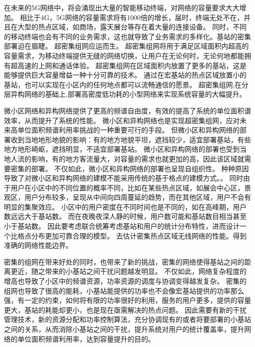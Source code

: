 

在未来的5G网络中，将会涌现出大量的智能移动终端，对网络的容量要求大大增加。
相比于4G，5G网络的容量需求将有1000倍的增长，届时，终端无处不在，并且在大型的热点区域，如商场，露天展台等存在着大量的连接设备。
同时，不同的移动终端也会有不同的业务需求，这也就导致了业务需求的多样化。基站的密集部署迫在眉睫。
超密集组网应运而生。
超密集组网将用于满足区域面积内超高的容量需求，为移动终端提供无缝的网络切换，让用户在无论何时，无论何地都能拥有超高速的上网和通话体验。
超密集组网在区域面积内放置了更多的基站，这是能够提供巨大容量增益一种十分可靠的技术。
通过在宏基站的热点区域放置小的基站，也可以实现在小区内的任何地点都可以流畅通信的愿景。
超密集组网,在分层异构网络的基础上,部署高密度低功耗的小型网络来实现系统容量的大幅提升。

微小区网络和异构网络提供了更高的频谱自由度，有效的提高了系统的单位面积谱效率，从而提升了系统的性能。
微小区和异构网络也是实现超密集组网，应对未来高单位面积频谱利用率挑战的一种重要可行的手段。
但微小区和异构网络的部署收到当地地形地貌的影响：有的地方地貌平坦，遮挡较少，适宜部署基站，有些地方地形崎岖，遮挡明显，不适宜部署基站。
微小区和异构网络的部署也受到当地人流的影响，有的地方客流量大，对容量的需求也就更加的高，因此该区域就需要密集的部署。
不仅如此，微小区和异构网络的部署也呈现自组织性。
种种原因导致了对微小区和异构网络的建模不能采用传统的基于格点的建模方式。。
同时由于用户在小区中的不同位置的概率不同，比如在某些热点区域，如展会中心区，景观区，用户分布较多，呈现从中间向四周蔓延的趋势，而在其他区域，用户不会有明显的集聚效应。
小区中的用户密度在不同时间也是不同的，如在高峰期，用户数远远大于基站数。
而在夜晚夜深人静的时候，用户数可能和基站数目相当甚至小于基站数。
因此要考虑联合统筹考虑基站和用户的统计分布特性，进而设计一个比格点分布更加可靠合理的模型。
去估计密集热点区域无线网络的性能。得到准确的网络性能边界。

密集的组网在带来好处的同时，也带来了新的挑战，密集的网络使得基站之间的距离更近，随之带来的小基站之间干扰问题越发明显。
不仅如此，网络复杂程度的增高也导致了小区中的频谱资源，功率资源的调度与协调变得越发复杂。
密集的组网也导致了很高的能耗，小基站能提供的功率也不会像宏基站提供的功率那么强，有一定的约束，如何将有限的功率很好的利用，服务的用户更多，提供的容量更大，基站的耗能却更小，也是现在亟需解决的热点问题。
因此需要有新的干扰管理技术，新的资源分配和功率控制算法，充分协调现有的或者将要部署的小基站之间的关系，从而消除小基站之间的干扰，提升系统对用户的统计覆盖率，提升网络的单位面积频谱利用率，达到容量提升的目的。


